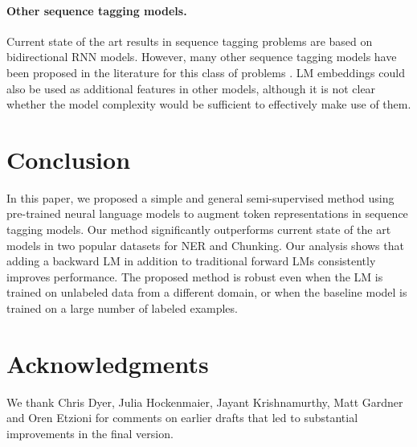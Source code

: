 \documentclass[11pt,a4paper]{article}
\begin{document}
\paragraph{Other sequence tagging models.}
Current state of the art results in sequence tagging problems are based on bidirectional RNN models.
However, many other sequence tagging models have been proposed in the literature for this class of problems \citep[e.g.,][]{CRF:Lafferty2001,collins:02}. 
LM embeddings could also be used as additional features in other models, although it is not clear whether the model complexity would be sufficient to effectively make use of them.



\section{Conclusion}
In this paper, we proposed a simple and general semi-supervised method using pre-trained neural language models to augment token representations in sequence tagging models.
Our method significantly outperforms current state of the art models in two popular datasets for NER and Chunking. 
Our analysis shows that adding a backward LM in addition to traditional forward LMs consistently improves performance.
The proposed method is robust even when the LM is trained on unlabeled data from a different domain, or when the baseline model is trained on a large number of labeled examples.







\section*{Acknowledgments}
We thank Chris Dyer, Julia Hockenmaier, Jayant Krishnamurthy, Matt Gardner and Oren Etzioni for comments on earlier drafts that led to substantial improvements in the final version.  



\end{document}
